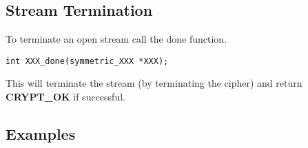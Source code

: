 \documentclass[synpaper]{book}
\begin{document}
\subsection{Stream Termination}
To terminate an open stream call the done function.

  
\begin{verbatim}
int XXX_done(symmetric_XXX *XXX);
\end{verbatim}

This will terminate the stream (by terminating the cipher) and return \textbf{CRYPT\_OK} if successful.

\newpage
\subsection{Examples}
\end{document}

